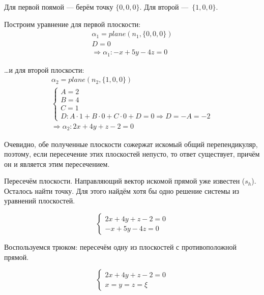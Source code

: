 \documentclass[12pt, a4paper]{article}
\begin{document}
    Для первой поямой — берём точку $\{0, 0, 0\}$.
    Для второй — $\{ 1, 0, 0 \}$.

    Построим уравнение для первой плоскости:
    \begin{gather}
        \alpha_1 = plane(n_1, \{0, 0, 0\}) \\
        D = 0 \\
        \Rightarrow \alpha_1: -x + 5y - 4z = 0
    \end{gather}

    …и для второй плоскости:
    \begin{gather}
        \alpha_2 = plane(n_2, \{1, 0, 0\}) \\
        \begin{cases}
            A = 2 \\
            B = 4 \\
            C = 1 \\
            D: A \cdot 1 + B \cdot 0 + C \cdot 0 + D = 0 \Longrightarrow D = -A = -2
        \end{cases} \\
        \Rightarrow \alpha_2: 2x + 4y + z - 2 = 0
    \end{gather}


    Очевидно, обе полученные плоскости сожержат искомый общий
    перепендикуляр, поэтому, если пересечение этих плоскостей непусто, 
    то ответ существует, причём он и является этим пересечением.

    Пересечём плоскости. Направляющий вектор
    искомой прямой уже известен ($s_h$). Осталось найти точку.
    Для этого найдём хотя бы одно решение системы из уравнений плоскостей.

    \begin{equation}
        \begin{cases}
            2x + 4y + z - 2 = 0 \\
            -x + 5y - 4z = 0
        \end{cases}
    \end{equation}

    Воспользуемся трюком: пересечём одну из плоскостей с противоположной прямой.

    \begin{equation}
        \begin{cases}
            2x + 4y + z − 2 = 0 \\
            x = y = z = \xi
        \end{cases}
    \end{equation}
\end{document}
